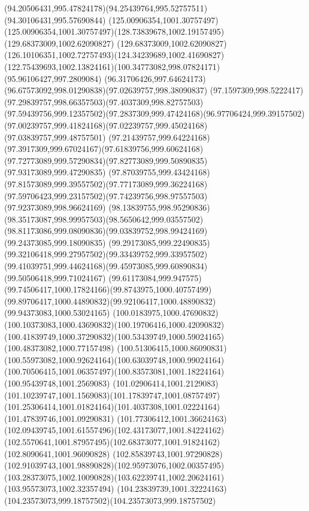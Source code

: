 {{\curveto(94.20506431,995.47824178)(94.25439764,995.52757511)(94.30106431,995.57690844)
\lineto(125.00906354,1001.30757497)
\curveto(125.00906354,1001.30757497)(128.73839678,1002.19157495)(129.68373009,1002.62090827)
\curveto(129.68373009,1002.62090827)(126.10106351,1002.72757493)(124.34239689,1002.41690827)
\curveto(122.75439693,1002.13824161)(100.34773082,998.07824171)(95.96106427,997.2809084)
\curveto(96.31706426,997.64624173)(96.67573092,998.01290838)(97.02639757,998.38090837)
\curveto(97.1597309,998.5222417)(97.29839757,998.66357503)(97.4037309,998.82757503)
\curveto(97.59439756,999.12357502)(97.2837309,999.47424168)(96.97706424,999.39157502)
\curveto(97.00239757,999.41824168)(97.02239757,999.45024168)(97.03839757,999.48757501)
\curveto(97.21439757,999.64224168)(97.3917309,999.67024167)(97.61839756,999.60624168)
\curveto(97.72773089,999.57290834)(97.82773089,999.50890835)(97.93173089,999.47290835)
\curveto(97.87039755,999.43424168)(97.81573089,999.39557502)(97.77173089,999.36224168)
\curveto(97.59706423,999.23157502)(97.74239756,998.97557503)(97.92373089,998.96624169)
\curveto(98.13839755,998.95290836)(98.35173087,998.99957503)(98.5650642,999.03557502)
\curveto(98.81173086,999.08090836)(99.03839752,998.99424169)(99.24373085,999.18090835)
\curveto(99.29173085,999.22490835)(99.32106418,999.27957502)(99.33439752,999.33957502)
\curveto(99.41039751,999.44624168)(99.45973085,999.60890834)(99.50506418,999.71024167)
\curveto(99.61173084,999.947575)(99.74506417,1000.17824166)(99.8743975,1000.40757499)
\curveto(99.89706417,1000.44890832)(99.92106417,1000.48890832)(99.94373083,1000.53024165)
\curveto(100.0183975,1000.47690832)(100.10373083,1000.43690832)(100.19706416,1000.42090832)
\curveto(100.41839749,1000.37290832)(100.53439749,1000.59024165)(100.48373082,1000.77157498)
\curveto(100.51306415,1000.86090831)(100.55973082,1000.92624164)(100.63039748,1000.99024164)
\curveto(100.70506415,1001.06357497)(100.83573081,1001.18224164)(100.95439748,1001.2569083)
\curveto(101.02906414,1001.2129083)(101.10239747,1001.1569083)(101.17839747,1001.08757497)
\curveto(101.25306414,1001.01824164)(101.4037308,1001.02224164)(101.47839746,1001.09290831)
\curveto(101.77306412,1001.36624163)(102.09439745,1001.61557496)(102.43173077,1001.84224162)
\curveto(102.5570641,1001.87957495)(102.68373077,1001.91824162)(102.8090641,1001.96090828)
\curveto(102.85839743,1001.97290828)(102.91039743,1001.98890828)(102.95973076,1002.00357495)
\curveto(103.28373075,1002.10090828)(103.62239741,1002.20624161)(103.95573073,1002.32357494)
\curveto(104.23839739,1001.32224163)(104.23573073,999.18757502)(104.23573073,999.18757502)
}}
